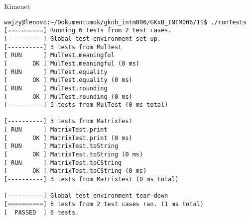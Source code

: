 \begin{frame}
  \begin{exampleblock}{}
    \scriptsize
    
  \end{exampleblock}
\end{frame}

\begin{frame}[fragile]
  \begin{block}{Kimenet}
    \tiny
    \vspace{-.5cm}
    \begin{verbatim}
wajzy@lenovo:~/Dokumentumok/gknb_intm006/GKxB_INTM006/11$ ./runTests 
[==========] Running 6 tests from 2 test cases.
[----------] Global test environment set-up.
[----------] 3 tests from MulTest
[ RUN      ] MulTest.meaningful
[       OK ] MulTest.meaningful (0 ms)
[ RUN      ] MulTest.equality
[       OK ] MulTest.equality (0 ms)
[ RUN      ] MulTest.rounding
[       OK ] MulTest.rounding (0 ms)
[----------] 3 tests from MulTest (0 ms total)

[----------] 3 tests from MatrixTest
[ RUN      ] MatrixTest.print
[       OK ] MatrixTest.print (0 ms)
[ RUN      ] MatrixTest.toString
[       OK ] MatrixTest.toString (0 ms)
[ RUN      ] MatrixTest.toCString
[       OK ] MatrixTest.toCString (0 ms)
[----------] 3 tests from MatrixTest (0 ms total)

[----------] Global test environment tear-down
[==========] 6 tests from 2 test cases ran. (1 ms total)
[  PASSED  ] 6 tests.\end{verbatim}
    \vspace{-.4cm}
  \end{block}
\end{frame}

